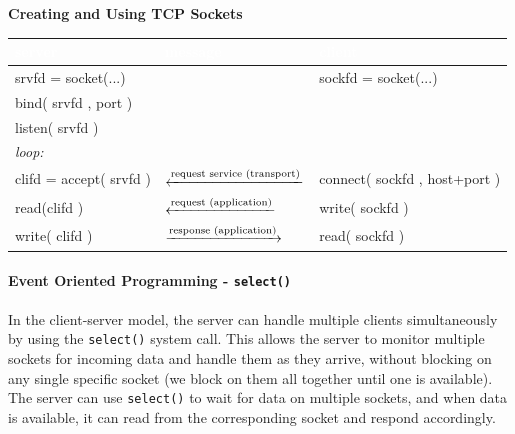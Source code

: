 \documentclass[openany,12pt]{book}
\newcommand{\code}[1]{\texttt{#1}}
\newcommand{\red}[1]{\textcolor{Red}{#1}}
\begin{document}
\begin{samepage}
  \begin{center}
    \textbf{Creating and Using TCP Sockets}
    \begin{tabular}{|>{\raggedright\arraybackslash\ttfamily}p{4cm}|
                     >{\centering\arraybackslash}p{5.5cm}|
                     >{\raggedright\arraybackslash\ttfamily}p{4cm}|}
      \hline
      \rowcolor{blue!50}
      \textcolor{white}{\textbf{server}} &
      \textcolor{white}{\textbf{message}} &
      \textcolor{white}{\textbf{client}} \\
      \hline
      srvfd = socket(...) & & sockfd = socket(...) \\
      
      bind( srvfd , port ) & & \\
      
      listen( srvfd ) & & \\
      
      \normalfont\textit{loop:} & & \\
      
      clifd = accept( srvfd ) &
      \red{$\xleftarrow{\text{\textcolor{black}{request service (transport)}}}$ } &
      connect( sockfd , host+port ) \\
      
      read(clifd ) &
      \red{$\xleftarrow{\text{\textcolor{black}{request (application)}}}$ } &
      write( sockfd ) \\
      
      write( clifd ) &
      \red{$\xrightarrow{\text{\textcolor{black}{response (application)}}}$ } &
      read( sockfd ) \\
      \hline
    \end{tabular}
  \end{center}
\end{samepage}



\paragraph{Event Oriented Programming - \code{select()}} In the client-server model, the server can handle multiple clients simultaneously by using the \code{select()} system call. This allows the server to monitor multiple sockets for incoming data and handle them as they arrive, without blocking on any single specific socket (we block on them all together until one is available). The server can use \code{select()} to wait for data on multiple sockets, and when data is available, it can read from the corresponding socket and respond accordingly.
\end{document}
